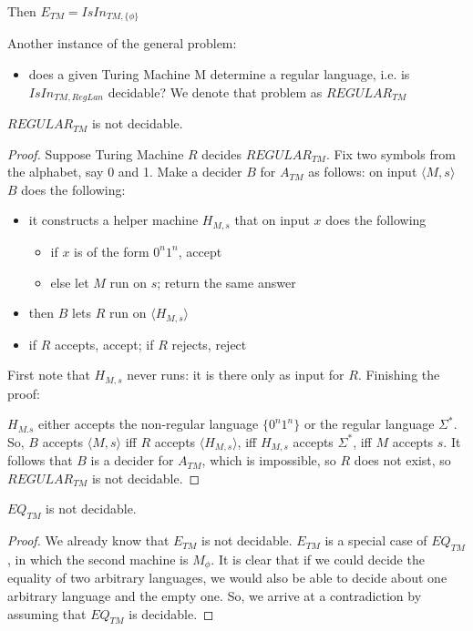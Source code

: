Then $E_{TM} = IsIn_{TM,\{\phi\}}$


Another instance of the general problem:
\begin{itemize}
\item[] does a given Turing Machine M determine a regular language,
  i.e.  is $IsIn_{TM,RegLan}$ decidable? We denote that problem as
$REGULAR_{TM}$
\end{itemize}

\begin{theorem}
$REGULAR_{TM}$ is not decidable.
\end{theorem}
\begin{proof}
Suppose Turing Machine $R$ decides $REGULAR_{TM}$. Fix two symbols
from the alphabet, say 0 and 1. Make a decider $B$ for $A_{TM}$ as
follows: on input $\langle M,s \rangle$ $B$ does the following:
\begin{itemize}
\item it constructs a helper machine $H_{M,s}$ that on input $x$ does
  the following
\begin{itemize}
\item if $x$ is of the form $0^n1^n$, accept
\item else let $M$ run on $s$; return the same answer
\end{itemize}

\item then $B$ lets $R$ run on  $\langle H_{M,s} \rangle$
\item if $R$ accepts, accept; if $R$ rejects, reject
\end{itemize}

First note that $H_{M,s}$ never runs: it is there only as input for
$R$. Finishing the proof:


$H_{M.s}$ either accepts the non-regular language $\{0^n1^n\}$
or the regular language $\Sigma^*$. So, $B$ accepts $\langle
M,s \rangle$ iff $R$ accepts $\langle H_{M,s} \rangle$, iff $H_{M,s}$
accepts $\Sigma^*$, iff $M$ accepts $s$. It follows that $B$ is a
decider for $A_{TM}$, which is impossible, so $R$ does not exist, so
$REGULAR_{TM}$ is not decidable.
\end{proof}

\begin{theorem} \label{reduction1}
$EQ_{TM}$ is not decidable.
\end{theorem}
\begin{proof}
We already know that $E_{TM}$ is not decidable. $E_{TM}$ is a special
case of $EQ_{TM}$, in which the second machine is $M_\phi$. It is
clear that if we could decide the equality of two arbitrary languages,
we would also be able to decide about one arbitrary language
and the empty one. So, we arrive at a contradiction by assuming that
$EQ_{TM}$ is decidable.
\end{proof}

